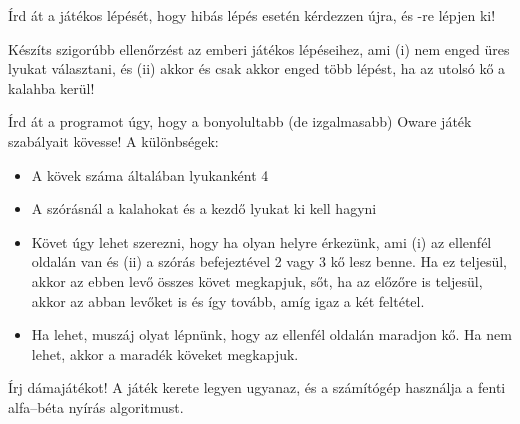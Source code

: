 \begin{problem}
Írd át a játékos lépését, hogy hibás lépés
esetén kérdezzen újra, és -re lépjen ki!
\end{problem}
\begin{problem}
Készíts szigorúbb ellenőrzést az emberi játékos
lépéseihez, ami (i) nem enged üres lyukat
választani, és (ii) akkor és csak akkor enged több
lépést, ha az utolsó kő a kalahba kerül!
\end{problem}
\begin{problem}
Írd át a programot úgy, hogy a bonyolultabb (de
izgalmasabb) Oware játék szabályait kövesse!  A
különbségek:
\begin{itemize}
\item A kövek száma általában lyukanként 4
\item A szórásnál a kalahokat és a kezdő lyukat ki kell hagyni
\item Követ úgy lehet szerezni, hogy ha olyan helyre
  érkezünk, ami (i) az ellenfél oldalán van és (ii)
  a szórás befejeztével 2 vagy 3 kő lesz benne.  Ha
  ez teljesül, akkor az ebben levő összes követ
  megkapjuk, sőt, ha az előzőre is teljesül, akkor
  az abban levőket is és így tovább, amíg igaz a két
  feltétel.
\item Ha lehet, muszáj olyat lépnünk, hogy az
  ellenfél oldalán maradjon kő. Ha nem lehet, akkor
  a maradék köveket megkapjuk.
\end{itemize}
\end{problem}
\begin{problem}
Írj dámajátékot! A játék kerete legyen ugyanaz,
és a számítógép használja a fenti alfa--béta nyírás
algoritmust.
\end{problem}

